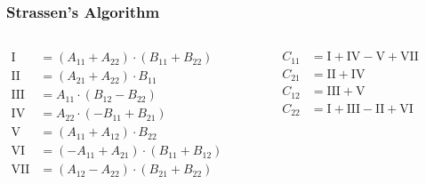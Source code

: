 \begin{frame}
  \frametitle{Strassen's Algorithm}
  \begin{columns}
    \begin{column}{0.5\textwidth}
      \large
      \begin{math}
      \begin{aligned}
      \text{I}   &= (A_{11} + A_{22}) \cdot (B_{11} + B_{22}) \\
      \text{II}  &= (A_{21} + A_{22}) \cdot B_{11} \\
      \text{III} &= A_{11} \cdot (B_{12}-B_{22}) \\
      \text{IV}  &= A_{22} \cdot (-B_{11}+B_{21}) \\
      \text{V}   &= (A_{11} + A_{12}) \cdot B_{22} \\
      \text{VI}  &= (-A_{11} + A_{21}) \cdot (B_{11} + B_{12}) \\
      \text{VII} &= (A_{12} - A_{22}) \cdot (B_{21} + B_{22}) \\
      \end{aligned}
      \end{math}

    \end{column}

    \begin{column}{0.5\textwidth}
        \large
        \begin{math}
        \begin{aligned}
        C_{11} &= \text{I} + \text{IV} - \text{V} + \text{VII} \\
        C_{21} &= \text{II} + \text{IV} \\
        C_{12} &= \text{III} + \text{V}\\
        C_{22} &= \text{I} + \text{III} - \text{II} + \text{VI} \\
        \end{aligned}
        \end{math}

    \end{column}
\end{columns}
\end{frame}




